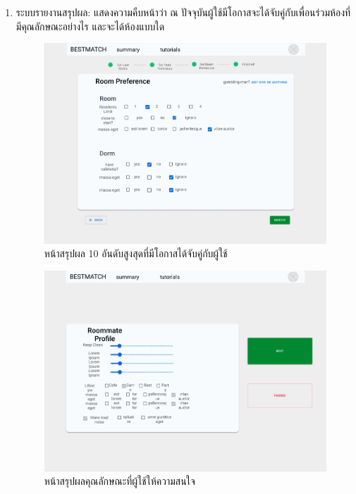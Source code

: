 \begin{enumerate}
  \clearpage
  \item ระบบรายงานสรุปผล: แสดงความคืบหน้าว่า ณ ปัจจุบันผู้ใช้มีโอกาสจะได้จับคู่กับเพื่อนร่วมห้องที่มีคุณลักษณะอย่างไร 
        และจะได้ห้องแบบใด 
  \begin{figure}[h]
  \begin{center}
  \includegraphics[width=\linewidth]{photo/student/room-pref.png}
  \end{center}
  \caption{หน้าสรุปผล 10 อันดับสูงสุดที่มีโอกาสได้จับคู่กับผู้ใช้}
  \label{fig:select-profile}
  \end{figure}
  \begin{figure}[h]
  \begin{center}
  \includegraphics[width=\linewidth]{photo/student/pick.png}
  \end{center}
  \caption{หน้าสรุปผลคุณลักษณะที่ผู้ใช้ให้ความสนใจ}
  \label{fig:summary}
  \end{figure}


\end{enumerate}
